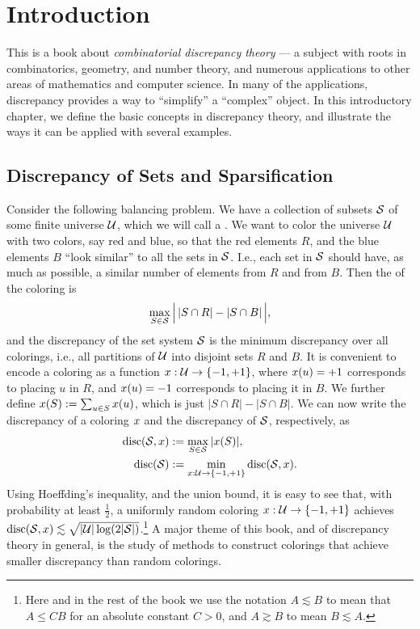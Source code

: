 \chapter{Introduction}
\label{ch1-intro} %

This is a book about \emph{combinatorial discrepancy theory} --- a
subject with roots in combinatorics, geometry, and number theory, and
numerous applications to other areas of mathematics and computer
science. In many of the applications, discrepancy provides a way to
``simplify'' a ``complex'' object. In this introductory chapter, we define the basic concepts in discrepancy theory, and illustrate the ways it can be applied with several examples.

\section{Discrepancy of Sets and Sparsification}

Consider the following balancing problem. We have a collection of subsets $\mathcal{S}$ of some finite universe $\mathcal{U}$, which we will call a . We want to color the universe $\mathcal{U}$ with two colors, say red and blue, so that the red elements $R$, and the blue elements $B$ ``look similar'' to all the sets in $\mathcal{S}$. I.e., each set in $\mathcal{S}$ should have, as much as possible, a similar number of elements from $R$ and from $B$. Then the  of the coloring is 
\[
\max_{S \in \mathcal{S}} \Big|\,|S\cap R| - |S \cap B|\,\Big|,
\]
and the discrepancy of the set system $\mathcal{S}$ is the minimum discrepancy over all colorings, i.e., all partitions of $\mathcal{U}$ into disjoint sets $R$ and $B$. It is convenient to encode a coloring as a function $x:\mathcal{U} \to \{-1,+1\}$,
where $x(u)=+1$ corresponds to placing $u$ in $R$, and $x(u)=-1$ corresponds to placing it in $B$. We further define $x(S) := \sum_{u \in S}x(u)$, which is just $|S\cap R| - |S \cap B|$.
We can now write the discrepancy of a coloring $x$ and the discrepancy of $\mathcal{S}$, respectively, as
\begin{align*}
    \operatorname{disc}(\mathcal{S},x) &:= \max_{S \in \mathcal{S}}|x(S)|,\\
    \operatorname{disc}(\mathcal{S}) &:= \min_{x:\mathcal{U}\to\{-1,+1\}} \operatorname{disc}(\mathcal{S},x).
\end{align*}
Using Hoeffding's inequality, and the union bound, it is easy to see that, with probability at least $\frac12$, a uniformly random coloring $x:\mathcal{U} \to \{-1,+1\}$ achieves $\operatorname{disc}(\mathcal{S},x) \lesssim \sqrt{|\mathcal{U}|\log(2|\mathcal{S}|)}$.\footnote{Here and in the
  rest of the book we use the notation $A\lesssim B$ to mean that
  $A \le CB$ for an absolute constant $C > 0$, and $A \gtrsim B$ to
  mean $B \lesssim A$.}  A major theme of this book, and of discrepancy theory in general, is the study of methods to construct colorings that achieve smaller discrepancy than random colorings. 

